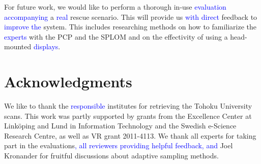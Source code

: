 \documentclass{egpubl}
\newcommand{\diff}[1]{\textcolor{blue}{#1}}
\begin{document}
For future work, we would like to perform a thorough in-use \diff{evaluation accompanying} a \diff{real} rescue scenario. This will provide us \diff{with direct} feedback to \diff{improve the} system. This includes researching methods on how to familiarize the \diff{experts} with the PCP and the SPLOM and on the effectivity of using a head-mounted \diff{displays}.



\section*{Acknowledgments}
We like to thank the \diff{responsible} institutes for retrieving the Tohoku University scans. This work was partly supported by grants from the Excellence Center at Link\"oping and Lund in Information Technology and the Swedish e-Science Research Centre, as well as VR grant 2011-4113. We thank all experts for taking part in the evaluations\diff{, all reviewers providing helpful feedback, and }Joel Kronander for fruitful discussions about adaptive sampling methods.

%


\end{document}
